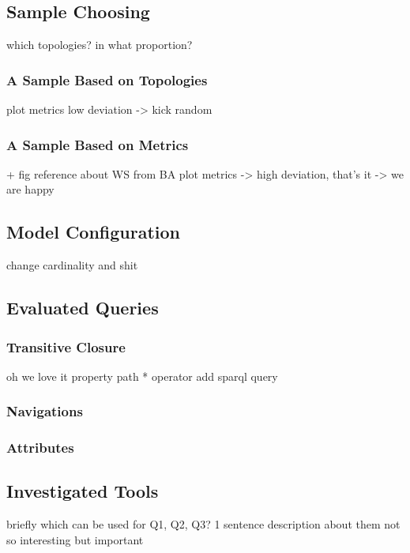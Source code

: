 \subsection{Sample Choosing}
which topologies? in what proportion?
\subsubsection{A Sample Based on Topologies}

plot metrics low deviation -> kick random

\subsubsection{A Sample Based on Metrics}
+ fig reference about WS from BA
plot metrics -> high deviation, that's it -> we are happy

\subsection{Model Configuration}
change cardinality and shit
\subsection{Evaluated Queries}

\subsubsection{Transitive Closure}
oh we love it
property path * operator
add sparql query
\subsubsection{Navigations}
\subsubsection{Attributes}
\subsection{Investigated Tools} briefly
which can be used for Q1, Q2, Q3? 
1 sentence description about them not so interesting but important

